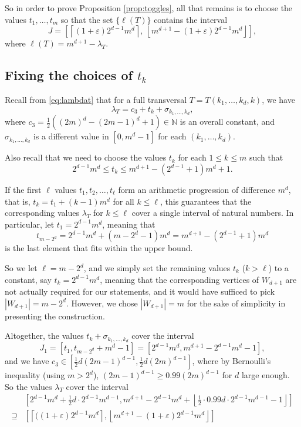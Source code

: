 \documentclass[10pt,a4paper]{article}
\numberwithin{equation}{section}
\newcommand{\nn}{\mathbb{N}}
\newcommand{\eps}{\varepsilon}
\begin{document}
So in order to prove Proposition \ref{prop:toggles}, all that remains is to choose the values $t_1, \ldots, t_m$ so that the set $\{\ell(T)\}$ contains the interval
$$J=\left[\left\lceil(1+\eps)2^{d-1}m^d\right\rceil,~ \left\lfloor m^{d+1}-(1+\eps)2^{d-1}m^d\right\rfloor\right],$$ where $\ell(T)=m^{d+1}-\lambda_T$.

\subsection{Fixing the choices of $t_k$}\label{subsec:fixingtkchoices}

Recall from \eqref{eq:lambdat} that for a full transversal $T=T(k_1, \ldots, k_d, k)$, we have  $$\lambda_T=c_3+ t_k + \sigma_{k_1, \ldots, k_d},$$ where $c_3=\frac12((2m)^d-(2m-1)^d+1)\in \nn$ is an overall constant, and $\sigma_{k_1, \ldots, k_d}$ is a different value in $[0,m^d-1]$ for each $(k_1, \ldots, k_d)$.

Also recall that we need to choose the values $t_k$ for each $1\le k\le m$ such that $$2^{d-1}m^d\le t_k\le m^{d+1}-(2^{d-1}+1)m^d+1.$$

If the first $\ell$ values $t_1, t_2, \ldots, t_{\ell}$ form an arithmetic progression of difference $m^d$, that is, $t_k=t_1+(k-1)m^d$ for all $k\le \ell$, this guarantees that the corresponding values $\lambda_T$ for $k\le \ell$ cover a single interval of natural numbers. In particular, let $t_1=2^{d-1}m^d$, meaning that $$t_{m-2^d}=2^{d-1}m^d+(m-2^d-1)m^d=m^{d+1}-(2^{d-1}+1)m^d$$ is the last element that fits within the upper bound.

So we let $\ell=m-2^d$, and we simply set the remaining values $t_k$ ($k>\ell$) to a constant, say $t_k=2^{d-1}m^d$, meaning that the corresponding vertices of $W_{d+1}$ are not actually required for our statements, and it would have sufficed to pick $|W_{d+1}|=m-2^d$. However, we chose $|W_{d+1}|=m$ for the sake of simplicity in presenting the construction.

Altogether, the values $t_k+\sigma_{k_1, \ldots, k_d}$ cover the interval $$J_1=[t_1, t_{m-2^d}+m^d-1]=[2^{d-1}m^d, m^{d+1}-2^{d-1}m^d-1],$$ and we have $c_3\in \left[\frac12d(2m-1)^{d-1}, \frac12d(2m)^{d-1}\right]$, where by Bernoulli's inequality (using $m>2^d$), $(2m-1)^{d-1}\ge 0.99(2m)^{d-1}$ for $d$ large enough. So the values $\lambda_T$ cover the interval
\begin{equation*}
\begin{split}
& \left[2^{d-1}m^d+\frac12d\cdot 2^{d-1}m^{d-1}, m^{d+1}-2^{d-1}m^d+\left\lfloor\frac12\cdot 0.99 d\cdot 2^{d-1}m^{d-1}-1\right\rfloor\right] \\
\supseteq & \left[\left\lceil((1+\eps)2^{d-1}m^d\right\rceil, \left\lfloor m^{d+1}-(1+\eps)2^{d-1}m^d\right\rfloor\right]
\end{split}
\end{equation*}
\end{document}

